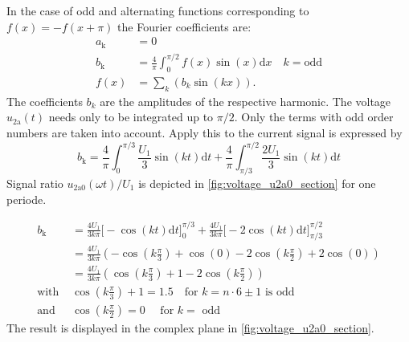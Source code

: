 \begin{solutionblock}
    In the case of odd and alternating functions corresponding to $f(x)=-f(x+\pi)$ the Fourier coefficients are:
    \begin{equation}
        \begin{split}
        a_\mathrm{k} &= 0 \\
        b_\mathrm{k} &= \frac{4}{\pi} \int_0^{\pi/2} f(x)\sin(x) \mathrm{d}x \quad k=\mathrm{odd} \\
        f(x) &= \sum_{k}^{} \left( b_k \sin(kx) \right).
       \end{split}
    \end{equation}
    The coefficients $b_k$ are the amplitudes of the respective harmonic. The voltage $u_{\mathrm{2a}}(t)$ needs 
    only to be integrated up to $\pi/2$. Only the terms with odd order numbers are taken into account.
    Apply this to the current signal is expressed by 
    \begin{equation}
        b_\mathrm{k} = \frac{4}{\pi} \int_0^{\pi/3} \frac{U_{\mathrm{1}}}{3} \sin(kt) \mathrm{d}t 
                        + \frac{4}{\pi} \int_{\pi/3}^{\pi/2} \frac{2U_{\mathrm{1}}}{3} \sin(kt) \mathrm{d}t
    \end{equation}
    Signal ratio $u_{\mathrm{2a0}}(\omega t)/U_{\mathrm{1}}$ is depicted in \autoref{fig:voltage_u2a0_section} for one periode.
       
    \begin{equation}
        \begin{split}
            b_\mathrm{k} &= \frac{4U_{\mathrm{1}}}{3k\pi} \big[-\cos(kt)\mathrm{d}t \big]_0^{\pi/3}
            + \frac{4U_{\mathrm{1}}}{3k\pi} \big[-2\cos(kt)\mathrm{d}t \big]_{\pi/3}^{\pi/2} \\
            &= \frac{4U_{\mathrm{1}}}{3k\pi} \left(-\cos(k\frac{\pi}{3})+\cos(0) -2 \cos(k\frac{\pi}{2})+ 2\cos(0) \right) \\
            &= \frac{4U_{\mathrm{1}}}{3k\pi} \left( \cos(k\frac{\pi}{3})+ 1 -2 \cos(k\frac{\pi}{2})\right) \\
            \text{with } &\cos(k\frac{\pi}{3})+1=1.5 \quad  \text{for } k=n \cdot 6\pm1 \text{ is odd} \\
            \text{and  }&\cos(k\frac{\pi}{2})=0 \quad \text{ for } k=\text{ odd}
        \end{split}            
    \end{equation}
    The result is displayed in the complex plane in \autoref{fig:voltage_u2a0_section}. 


\end{solutionblock}
